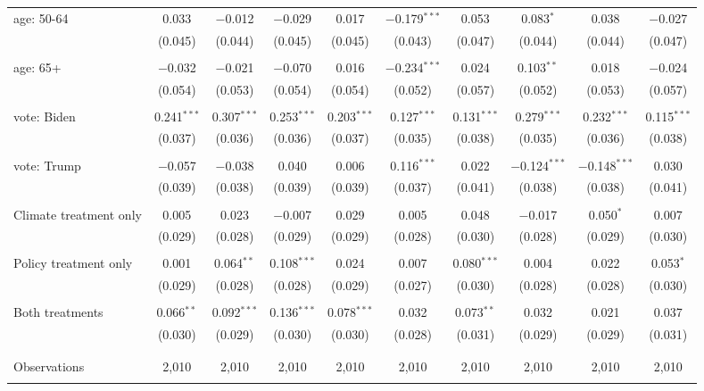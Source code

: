 \begin{tabular}{@{\extracolsep{5pt}}lccccccccc}
 age: 50-64 & 0.033 & $-$0.012 & $-$0.029 & 0.017 & $-$0.179$^{***}$ & 0.053 & 0.083$^{*}$ & 0.038 & $-$0.027 \\ 
  & (0.045) & (0.044) & (0.045) & (0.045) & (0.043) & (0.047) & (0.044) & (0.044) & (0.047) \\ 
  & & & & & & & & & \\ 
 age: 65+ & $-$0.032 & $-$0.021 & $-$0.070 & 0.016 & $-$0.234$^{***}$ & 0.024 & 0.103$^{**}$ & 0.018 & $-$0.024 \\ 
  & (0.054) & (0.053) & (0.054) & (0.054) & (0.052) & (0.057) & (0.052) & (0.053) & (0.057) \\ 
  & & & & & & & & & \\ 
 vote: Biden & 0.241$^{***}$ & 0.307$^{***}$ & 0.253$^{***}$ & 0.203$^{***}$ & 0.127$^{***}$ & 0.131$^{***}$ & 0.279$^{***}$ & 0.232$^{***}$ & 0.115$^{***}$ \\ 
  & (0.037) & (0.036) & (0.036) & (0.037) & (0.035) & (0.038) & (0.035) & (0.036) & (0.038) \\ 
  & & & & & & & & & \\ 
 vote: Trump & $-$0.057 & $-$0.038 & 0.040 & 0.006 & 0.116$^{***}$ & 0.022 & $-$0.124$^{***}$ & $-$0.148$^{***}$ & 0.030 \\ 
  & (0.039) & (0.038) & (0.039) & (0.039) & (0.037) & (0.041) & (0.038) & (0.038) & (0.041) \\ 
  & & & & & & & & & \\ 
 Climate treatment only & 0.005 & 0.023 & $-$0.007 & 0.029 & 0.005 & 0.048 & $-$0.017 & 0.050$^{*}$ & 0.007 \\ 
  & (0.029) & (0.028) & (0.029) & (0.029) & (0.028) & (0.030) & (0.028) & (0.029) & (0.030) \\ 
  & & & & & & & & & \\ 
 Policy treatment only & 0.001 & 0.064$^{**}$ & 0.108$^{***}$ & 0.024 & 0.007 & 0.080$^{***}$ & 0.004 & 0.022 & 0.053$^{*}$ \\ 
  & (0.029) & (0.028) & (0.028) & (0.029) & (0.027) & (0.030) & (0.028) & (0.028) & (0.030) \\ 
  & & & & & & & & & \\ 
 Both treatments & 0.066$^{**}$ & 0.092$^{***}$ & 0.136$^{***}$ & 0.078$^{***}$ & 0.032 & 0.073$^{**}$ & 0.032 & 0.021 & 0.037 \\ 
  & (0.030) & (0.029) & (0.030) & (0.030) & (0.028) & (0.031) & (0.029) & (0.029) & (0.031) \\ 
  & & & & & & & & & \\ 
\hline \\[-1.8ex] 

Observations & 2,010 & 2,010 & 2,010 & 2,010 & 2,010 & 2,010 & 2,010 & 2,010 & 2,010 \\ 
\hline 
\hline \\[-1.8ex] 
\end{tabular} 